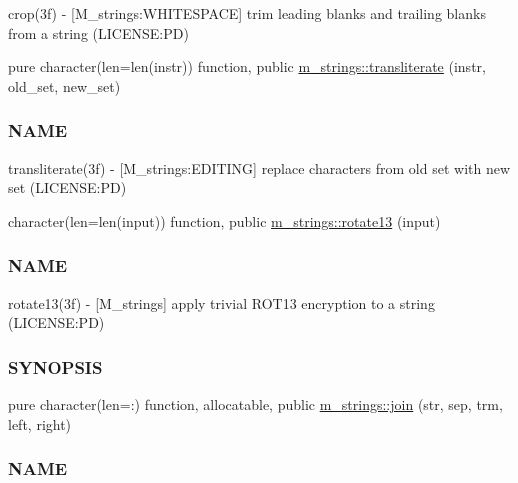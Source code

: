 \begin{DoxyCompactItemize}
\begin{DoxyCompactList}
crop(3f) -\/ \mbox{[}M\+\_\+strings\+:W\+H\+I\+T\+E\+S\+P\+A\+CE\mbox{]} trim leading blanks and trailing blanks from a string (L\+I\+C\+E\+N\+SE\+:PD) \end{DoxyCompactList}\item 
pure character(len=len(instr)) function, public \mbox{\hyperlink{namespacem__strings_aaee428861205782e002f5e7e8fb002f0}{m\+\_\+strings\+::transliterate}} (instr, old\+\_\+set, new\+\_\+set)
\begin{DoxyCompactList}\small\item\em \subsubsection*{N\+A\+ME}

transliterate(3f) -\/ \mbox{[}M\+\_\+strings\+:E\+D\+I\+T\+I\+NG\mbox{]} replace characters from old set with new set (L\+I\+C\+E\+N\+SE\+:PD) \end{DoxyCompactList}\item 
character(len=len(input)) function, public \mbox{\hyperlink{namespacem__strings_af155dcea0c0ccef21bb359040b673014}{m\+\_\+strings\+::rotate13}} (input)
\begin{DoxyCompactList}\small\item\em \subsubsection*{N\+A\+ME}

rotate13(3f) -\/ \mbox{[}M\+\_\+strings\mbox{]} apply trivial R\+O\+T13 encryption to a string (L\+I\+C\+E\+N\+SE\+:PD) \subsubsection*{S\+Y\+N\+O\+P\+S\+IS}\end{DoxyCompactList}\item 
pure character(len=\+:) function, allocatable, public \mbox{\hyperlink{namespacem__strings_a36c4cc6f83b736b4e337a1289694e3d6}{m\+\_\+strings\+::join}} (str, sep, trm, left, right)
\begin{DoxyCompactList}\small\item\em \subsubsection*{N\+A\+ME}


\end{DoxyCompactList}
\end{DoxyCompactItemize}
